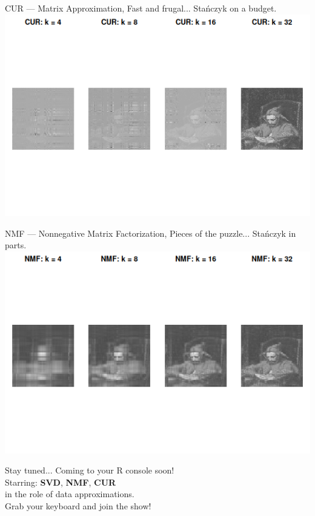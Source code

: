 \documentclass{beamer}
\begin{document}
\begin{frame}{CUR — Matrix Approximation, Fast and frugal... Stańczyk on a budget.}
  \centering
  \includegraphics[width=1\textwidth]{decomposition_CUR_stanczyk.png}\\[1ex]
  \end{frame}

\begin{frame}{NMF — Nonnegative Matrix Factorization, Pieces of the puzzle... Stańczyk in parts.}
  \centering
  \includegraphics[width=1\textwidth]{decomposition_NMF_stanczyk.png}\\[1ex]
  \end{frame}

\begin{frame}{Stay tuned...}
  \centering
  \Large Coming to your R console soon! \\
  \Large Starring: \textbf{SVD}, \textbf{NMF}, \textbf{CUR} \\
  \Large in the role of data approximations. \\
  \Large Grab your keyboard and join the show!
\end{frame}
\end{document}
